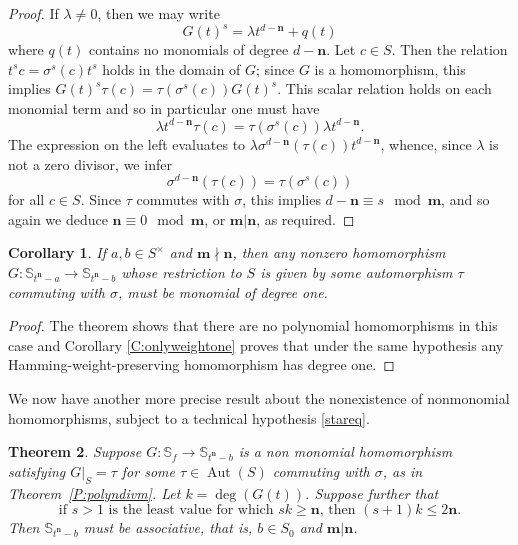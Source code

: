 \documentclass[11pt]{amsart}
\theoremstyle{plain}
\newtheorem{theorem}{Theorem}[section]
\newtheorem{corollary}[theorem]{Corollary}
\theoremstyle{definition}
\numberwithin{equation}{section}
\numberwithin{figure}{section}
\newcommand{\ring}{S}
\newcommand{\os}{\mathbf{m}}  %
\newcommand{\de}{\mathbf{n}}  %
\DeclareMathOperator{\Aut}{Aut}
\begin{document}
\begin{proof}
    If $\lambda \neq 0$, then we may write
    $$
    G(t)^s = \lambda t^{d-\de} + q(t)
    $$
    where $q(t)$ contains no monomials of degree $d-\de$.  Let $c\in \ring$.  Then the relation $t^sc=\sigma^s(c)t^s$ holds in the domain of $G$; since $G$ is a homomorphism, this implies $G(t)^s\tau(c)=\tau(\sigma^s(c))G(t)^s$.  This scalar relation holds on each monomial term and so in particular one must have
    $$
    \lambda t^{d-\de} \tau(c) = \tau(\sigma^s(c))\lambda t^{d-\de}.
    $$
    The expression on the left evaluates to  $\lambda \sigma^{d-\de}(\tau(c))t^{d-\de}$, whence, since $\lambda$ is not a  zero divisor, we infer
    $$
    \sigma^{d-\de}(\tau(c))=\tau(\sigma^s(c))
    $$
    for all $c\in \ring$. Since $\tau$ commutes with $\sigma$, this implies $d-\de\equiv s\mod \os$, and so again we deduce  $\de\equiv 0\mod \os$, or $\os|\de$, as required.
\end{proof}

\begin{corollary}\label{c:new}
If   $a,b\in \ring^\times$ and $\os \nmid\de$, then any nonzero homomorphism
 $G:\mathbb{S}_{t^\de-a} \to \mathbb{S}_{t^\de-b}$  whose restriction to $\ring$ is given by some automorphism $\tau$ commuting with $\sigma$, must be monomial of degree one.
\end{corollary}

\begin{proof}
    The theorem shows that there are no polynomial homomorphisms in this case and  Corollary \ref{C:onlyweightone} proves that under the same hypothesis any Hamming-weight-preserving homomorphism has degree one.
\end{proof}


 We now have another more precise result about the nonexistence of nonmonomial homomorphisms, subject to a technical hypothesis \eqref{stareq}.

\begin{theorem}\label{thm:main}
    Suppose $G: \mathbb{S}_{f}\to \mathbb{S}_{t^\de-b} $ is a non monomial homomorphism satisfying $G|_{\ring}=\tau$ for some $\tau\in \Aut(\ring)$ commuting with $\sigma$, as in Theorem~\ref{P:polyndivm}. Let $k=\deg(G(t))$.  Suppose further that
    \begin{equation}\label{stareq}
        \tag{$\star$} \text{if $s>1$ is the least value for which $sk\geq \de$, then $(s+1)k\leq 2\de$}.
    \end{equation}
    Then $\mathbb{S}_{t^\de-b}$ 
    must be associative, that is, $b\in \ring_0$ and $\os|\de$.
\end{theorem}
\end{document}

